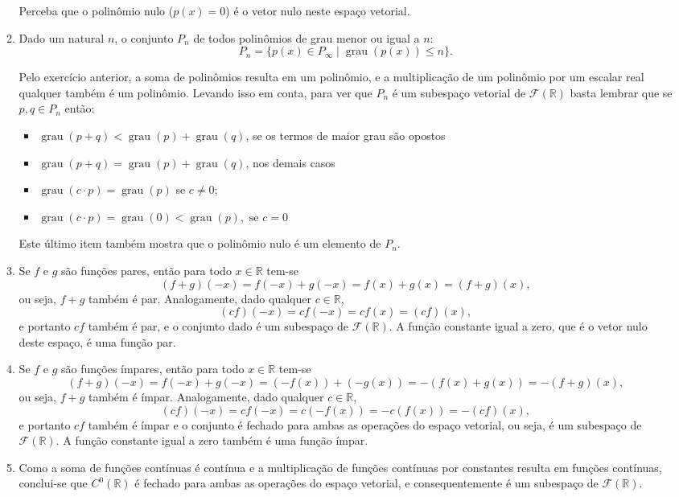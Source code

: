 \documentclass[12pt,a4paper]{article}
\newcommand*\R{\mathbb{R}}
\begin{document}
\begin{enumerate}
\begin{enumerate}
Perceba que o polinômio nulo ($p(x) = 0$) é o vetor nulo neste espaço vetorial.

\item Dado um natural $n$, o conjunto $P_n$ de todos polinômios de grau menor ou igual a $n$:
\[
P_n = \{ p(x) \in P_\infty \mid \operatorname{grau}(p(x)) \leq n \}.
\]

Pelo exercício anterior, a soma de polinômios resulta em um polinômio, e a multiplicação de um polinômio por um escalar real qualquer também é um polinômio. Levando isso em conta, para ver que $P_n$ é um subespaço vetorial de $\mathcal{F}(\R)$ basta lembrar que se $p, q \in P_n$ então:
\begin{itemize}
\item $\operatorname{grau}(p+q) < \operatorname{grau}(p) + \operatorname{grau}(q)$, se os termos de maior grau são opostos
\item $\operatorname{grau}(p+q) = \operatorname{grau}(p) + \operatorname{grau}(q)$, nos demais casos
\item $\operatorname{grau}(c \cdot p) = \operatorname{grau}(p)$ se $c \neq 0$;
\item $\operatorname{grau}(c \cdot p) = \operatorname{grau}(0) < \operatorname{grau}(p), \text{ se } c = 0$
\end{itemize}
Este último item também mostra que o polinômio nulo é um elemento de $P_n$.
\item Se $f$ e $g$ são funções pares, então para todo $x \in \R$ tem-se
\[
(f+g)(-x)
= f(-x) + g(-x)
= f(x) + g(x)
= (f + g)(x),
\]
ou seja, $f+g$ também é par. Analogamente, dado qualquer $c \in \R$,
\[
(cf)(-x)
= cf(-x)
= cf(x)
= (cf)(x),
\]
e portanto $cf$ também é par, e o conjunto dado é um subespaço de $\mathcal{F}(\R)$. A função constante igual a zero, que é o vetor nulo deste espaço, é uma função par.

\item Se $f$ e $g$ são funções ímpares, então para todo $x \in \R$ tem-se
\[
(f+g)(-x)
= f(-x) + g(-x)
= (-f(x)) + (-g(x))
= -(f(x) + g(x))
= -(f + g)(x),
\]
ou seja, $f+g$ também é ímpar. Analogamente, dado qualquer $c \in \R$,
\[
(cf)(-x)
= cf(-x)
= c(-f(x))
= -c(f(x))
= -(cf)(x),
\]
e portanto $cf$ também é ímpar e o conjunto é fechado para ambas as operações do espaço vetorial, ou seja, é um subespaço de $\mathcal{F}(\R)$. A função constante igual a zero também é uma função ímpar.

\item Como a soma de funções contínuas é contínua e a multiplicação de funções contínuas por constantes resulta em funções contínuas, conclui-se que $C^0(\R)$ é fechado para ambas as operações do espaço vetorial, e consequentemente é um subespaço de $\mathcal{F}(\R)$.


\end{enumerate}
\end{enumerate}
\end{document}
